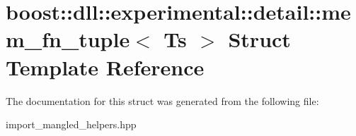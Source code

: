 \hypertarget{a01532}{}\section{boost\+:\+:dll\+:\+:experimental\+:\+:detail\+:\+:mem\+\_\+fn\+\_\+tuple$<$ Ts $>$ Struct Template Reference}
\label{a01532}


The documentation for this struct was generated from the following file\+:\begin{DoxyCompactItemize}
\item 
import\+\_\+mangled\+\_\+helpers.\+hpp\end{DoxyCompactItemize}
